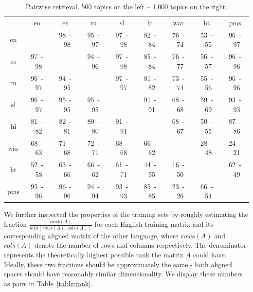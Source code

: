 {
\renewcommand\tabcolsep{3pt}
\begin{table}[t]
\begin{center}
\caption[Pairwise retrieval]{Pairwise retrieval, 500 topics on the left -- 1,000 topics on the right.}\label{table:retrieval}
\begin{tabular}{|c|c|c|c|c|c|c|c|c|}
\cline{1-9}
&	en&	es&	ru&	sl&	hi&	war&	ht&	pms\\\cline{1-9}
en&	    &	98~-~98&	95~-~97&	97~-~98&	82~-~84&	76~-~74&	53~-~55&	 96~-~97\\
\cline{1-9}
es&	97~-~98&	&	94~-~96&	97~-~98&	85~-~84&	76~-~77&	56~-~57&	96~-~96\\
\cline{1-9}
ru&	96~-~97&	94~-~95&	&	97~-~97&	81~-~82&	73~-~74&	55~-~56&	96~-~96\\
\cline{1-9}
sl&	96~-~97&	95~-~95&	95~-~95&	&	91~-~91&	68~-~68&	59~-~69&	93~-~93\\
\cline{1-9}
hi&	81~-~82&	82~-~81&	80~-~80&	91~-~91&	&	68~-~67&	50~-~55&	87~-~86\\
\cline{1-9}
war&	68~-~63&	71~-~68&	72~-~71&	68~-~68&	66~-~62&	&	28~-~48&	 24~-~21\\
\cline{1-9}
ht&	52~-~58&	63~-~66&	66~-~62&	61~-~71&	44~-~55&	16~-~50&	&	62~-~49\\
\cline{1-9}
pms&	95~-~96&	96~-~96&	94~-~94&	93~-~93&	85~-~85&	23~-~26&	66~-~54&	 \\
\cline{1-9}
\end{tabular}
\end{center}
\end{table}
}

We further inspected the properties of the training sets by roughly estimating the fraction
$\frac{rank(A)}{min\left(rows\left(A\right),~cols\left(A\right)\right)}$ for each English
training matrix and its corresponding aligned matrix of the other language, where $rows(A)$ and $cols(A)$
denote the number of rows and columns respectively. The denominator represents the theoretically
highest possible rank the matrix $A$ could have. Ideally, these two fractions should be
approximately the same - both aligned spaces should have reasonably similar dimensionality.
We display these numbers as pairs in Table~\ref{table:rank}.

